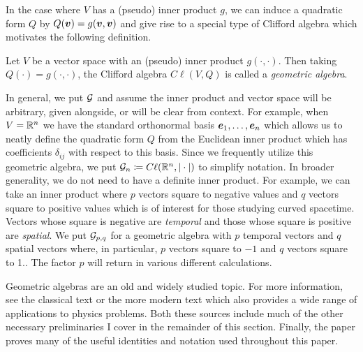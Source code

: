 In the case where $V$ has a (pseudo) inner product $g$, we can induce a quadratic form $Q$ by $Q(\boldsymbol{v})=g(\boldsymbol{v},\boldsymbol{v})$ and give rise to a special type of Clifford algebra which motivates the following definition.
\begin{definition}
Let $V$ be a vector space with an (pseudo) inner product $g(\cdot,\cdot)$. Then taking $Q(\cdot) = g(\cdot,\cdot)$, the Clifford algebra $C \ell(V,Q)$ is called a \emph{geometric algebra}.
\end{definition}
In general, we put $\mathcal{G}$ and assume the inner product and vector space will be arbitrary, given alongside, or will be clear from context.  For example, when $V=\mathbb{R}^n$ we have the standard orthonormal basis $\boldsymbol{e}_1,\dots,\boldsymbol{e}_n$ which allows us to neatly define the quadratic form $Q$ from the Euclidean inner product which has coefficients $\delta_{ij}$ with respect to this basis. Since we frequently utilize this geometric algebra, we put $\mathcal{G}_n \coloneqq C\ell(\mathbb{R}^n, |\cdot|)$ to simplify notation.  In broader generality, we do not need to have a definite inner product. For example, we can take an inner product where $p$ vectors square to negative values and $q$ vectors square to positive values which is of interest for those studying curved spacetime. Vectors whose square is negative are \emph{temporal} and those whose square is positive are \emph{spatial}. We put $\mathcal{G}_{p,q}$ for a geometric algebra with $p$ temporal vectors and $q$ spatial vectors where, in particular, $p$ vectors square to $-1$ and $q$ vectors square to 1.. The factor $p$ will return in various different calculations.

Geometric algebras are an old and widely studied topic. For more information, see the classical text \cite{hestenes_clifford_1986} or the more modern text \cite{doran_geometric_2003} which also provides a wide range of applications to physics problems. Both these sources include much of the other necessary preliminaries I cover in the remainder of this section. Finally, the paper \cite{chisolm_geometric_2012} proves many of the useful identities and notation used throughout this paper.

